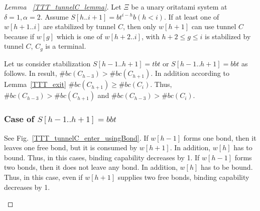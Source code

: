 \begin{proof}[Lemma~ \ref{TTT_tunnelC_lemma}]
Let $\Xi$ be a unary oritatami system at $\delta = 1, \alpha = 2$.
Assume $S[h..i+1] = bt^{i-h}b (h<i)$. If at least one of $w[h+1..i]$ are stabilized by tunnel $C$, then only $w[h+1]$ can use tunnel $C$ because if $w[g]$ which is one of $w[h+2..i]$, with $h+2 \leq g \leq i$ is stabilized by tunnel $C$, $C_g$ is a terminal.


Let us consider stabilization $S[h-1..h+1] = tbt$ or $S[h-1..h+1] = bbt$ as follows. In result, $\#bc(C_{h-3}) > \#bc(C_{h+1})$. In addition according to Lemma~\ref{TTT_exit} $\#bc(C_{h+1}) \geq \#bc(C_{i})$. Thus, $\#bc(C_{h-3}) > \#bc(C_{h+1})$ and $\#bc(C_{h-3}) > \#bc(C_{i})$.
\\

\subsubsection{Case of $S[h-1..h+1] = bbt$}
See Fig.~\ref{TTT_tunnelC_enter_usingBond}.
If $w[h-1]$ forms one bond, then it leaves one free bond, but it is consumed by $w[h+1]$.
In addition, $w[h]$ has to bound.
Thus, in this cases, binding capability decreases by 1.
If $w[h-1]$ forms two bonds, then it does not leave any bond.
In addition, $w[h]$ has to be bound.
Thus, in this case, even if $w[h+1]$ supplies two free bonds, binding capability decreases by 1.




\begin{figure}
  \begin{center}
\end{center}
\end{figure}
\end{proof}

